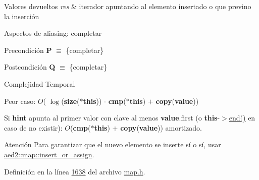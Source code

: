 \begin{DoxyRetVals}{Valores devueltos}
{\em res} & iterador apuntando al elemento insertado o que previno la inserción\\
\hline
\end{DoxyRetVals}
\begin{DoxyParagraph}{Aspectos de aliasing\+:}
completar
\end{DoxyParagraph}
\begin{DoxyPrecond}{Precondición}
{\bfseries P} $\equiv$ \{completar\} 
\end{DoxyPrecond}
\begin{DoxyPostcond}{Postcondición}
{\bfseries Q} $\equiv$ \{completar\}
\end{DoxyPostcond}

\begin{DoxyDescription}
\item[Complejidad Temporal]
\begin{DoxyItemize}
\item Peor caso\+: $O$( $\log$({\bfseries size}({\bfseries $\ast$this})) $\cdot$ {\bfseries cmp}({\bfseries $\ast$this}) $+$ {\bfseries copy}({\bfseries value}))
\item Si {\bfseries hint} apunta al primer valor con clave al menos {\bfseries value}.first (o {\bfseries this}-\/$>$\hyperlink{classaed2_1_1map_a76023e6a56cb625513e1b5ea028bf983_a76023e6a56cb625513e1b5ea028bf983}{end()} en caso de no existir)\+: $O$({\bfseries cmp}({\bfseries $\ast$this}) $+$ {\bfseries copy}({\bfseries value})) amortizado. 
\end{DoxyItemize}
\end{DoxyDescription}

\begin{DoxyAttention}{Atención}
Para garantizar que el nuevo elemento se inserte sí o sí, usar \hyperlink{classaed2_1_1map_a2ef6723c183916276b0afc4a4c721475_a2ef6723c183916276b0afc4a4c721475}{aed2\+::map\+::insert\+\_\+or\+\_\+assign}. 
\end{DoxyAttention}


Definición en la línea \hyperlink{map_8h_source_l01638}{1638} del archivo \hyperlink{map_8h_source}{map.\+h}.

\mbox{\label{classaed2_1_1map_a60aacba06b1579630b3c8e996cf248c8_a60aacba06b1579630b3c8e996cf248c8}} 
